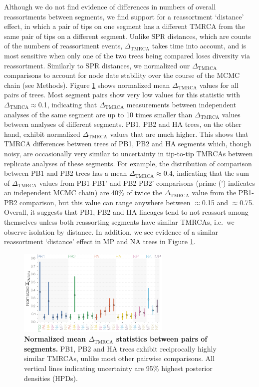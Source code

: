 \documentclass[11pt,oneside,letterpaper]{article}
\newcommand{\dtmrca}{\Delta_\mathrm{TMRCA}}
\begin{document}
Although we do not find evidence of differences in numbers of overall reassortments between segments, we find support for a reassortment `distance' effect, in which a pair of tips on one segment has a different TMRCA from the same pair of tips on a different segment.
Unlike SPR distances, which are counts of the numbers of reassortment events, $\dtmrca$ takes time into account, and is most sensitive when only one of the two trees being compared loses diversity via reassortment.
Similarly to SPR distances, we normalized our $\dtmrca$ comparisons to account for node date stability over the course of the MCMC chain (see Methods).
Figure \ref{deltaTMRCA} shows normalized mean $\dtmrca$ values for all pairs of trees.
Most segment pairs show very low values for this statistic with $\dtmrca\approx$0.1, indicating that $\dtmrca$ measurements between independent analyses of the same segment are up to 10 times smaller than $\dtmrca$ values between analyses of different segments.
PB1, PB2 and HA trees, on the other hand, exhibit normalized $\dtmrca$ values that are much higher.
This shows that TMRCA differences between trees of PB1, PB2 and HA segments which, though noisy, are occasionally very similar to uncertainty in tip-to-tip TMRCAs between replicate analyses of these segments.
For example, the distribution of comparison between PB1 and PB2 trees has a mean $\dtmrca$$\approx0.4$, indicating that the sum of $\dtmrca$ values from PB1-PB1' and PB2-PB2' comparisons (prime (') indicates an independent MCMC chain) are 40\% of twice the $\dtmrca$ value from the PB1-PB2 comparison, but this value can range anywhere between $\approx$0.15 and $\approx$0.75.
Overall, it suggests that PB1, PB2 and HA lineages tend to not reassort among themselves unless both reassorting segments have similar TMRCAs, i.e.\ we observe isolation by distance.
In addition, we see evidence of a similar reassortment `distance' effect in MP and NA trees in Figure \ref{deltaTMRCA}.

\begin{figure}[h]
	\centering		
	\includegraphics[width=0.65\textwidth]{figures/InfB_normalizedMuDeltaTMRCA.png}
	\caption{\textbf{Normalized mean $\dtmrca$ statistics between pairs of segments.}
PB1, PB2 and HA trees exhibit reciprocally highly similar TMRCAs, unlike most other pairwise comparisons.
All vertical lines indicating uncertainty are 95\% highest posterior densities (HPDs).}
	\label{deltaTMRCA}
\end{figure}
\end{document}
